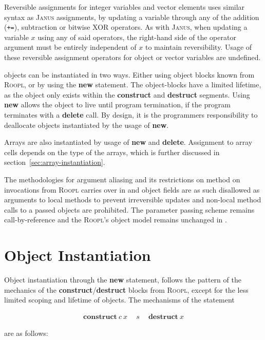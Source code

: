 Reversible assignments for integer variables and vector elements uses similar syntax as \textsc{Janus} assignments, by updating a variable through any of the addition (\texttt{+=}), subtraction or bitwise XOR operators. As with \textsc{Janus}, when updating a variable $x$ using any of said operators, the right-hand side of the operator argument must be entirely independent of $x$ to maintain reversibility. Usage of these reversible assignment operators for object or vector variables are undefined.

\rooplpp objects can be instantiated in two ways. Either using object blocks known from \textsc{Roopl}, or by using the \textbf{new} statement. The object-blocks have a limited lifetime, as the object only exists within the \textbf{construct} and \textbf{destruct} segments. Using \textbf{new} allows the object to live until program termination, if the program terminates with a \textbf{delete} call. By design, it is the programmers responsibility to deallocate objects instantiated by the usage of \textbf{new}.

Arrays are also instantiated by usage of \textbf{new} and \textbf{delete}. Assignment to array cells depends on the type of the arrays, which is further discussed in section~\ref{sec:array-instantiation}.

The methodologies for argument aliasing and its restrictions on method on invocations from \textsc{Roopl} carries over in \rooplpp and object fields are as such disallowed as arguments to local methods to prevent irreversible updates and non-local method calls to a passed objects are prohibited. The parameter passing scheme remains call-by-reference and the \textsc{Roopl}'s object model remains unchanged in \rooplpp.

\section{Object Instantiation}
\label{sec:object-instantiation}
Object instantiation through the \textbf{new} statement, follows the pattern of the mechanics of the \textbf{construct}/\textbf{destruct} blocks from \textsc{Roopl}, except for the less limited scoping and lifetime of objects. The mechanisms of the statement 

\begin{align*}
\textbf{construct}\ c\ x\ \quad s\ \quad \textbf{destruct}\ x
\end{align*}

are as follows:

